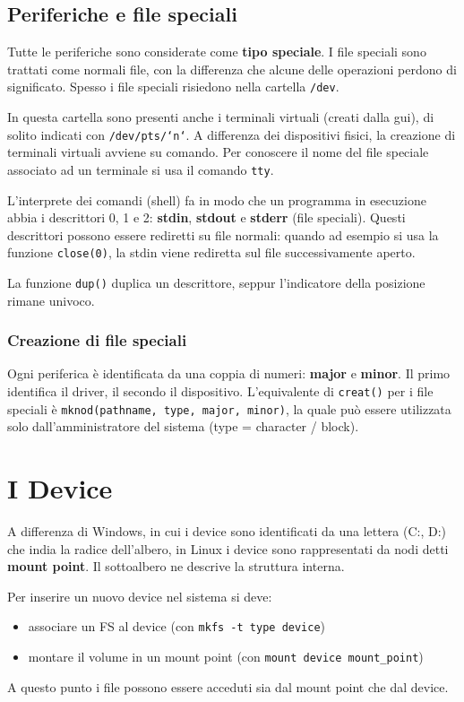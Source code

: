 \documentclass[12pt, a4paper]{report}
\begin{document}
\subsection{Periferiche e file speciali}
Tutte le periferiche sono considerate come \textbf{tipo speciale}. I file
speciali sono trattati come normali file, con la differenza che alcune delle
operazioni perdono di significato. Spesso i file speciali risiedono nella
cartella \texttt{/dev}.

In questa cartella sono presenti anche i terminali virtuali (creati dalla gui),
di solito indicati con \texttt{/dev/pts/`n`}. A differenza dei dispositivi fisici,
la creazione di terminali virtuali avviene su comando. Per conoscere il nome del
file speciale associato ad un terminale si usa il comando \texttt{tty}.

L'interprete dei comandi (shell) fa in modo che un programma in esecuzione abbia
i descrittori 0, 1 e 2: \textbf{stdin}, \textbf{stdout} e \textbf{stderr} (file
speciali). Questi descrittori possono essere rediretti su file normali: quando
ad esempio si usa la funzione \texttt{close(0)}, la stdin viene rediretta sul
file successivamente aperto.

La funzione \texttt{dup()} duplica un descrittore, seppur l'indicatore della
posizione rimane univoco.

\subsubsection{Creazione di file speciali}
Ogni periferica è identificata da una coppia di numeri: \textbf{major} e
\textbf{minor}. Il primo identifica il driver, il secondo il dispositivo.
L'equivalente di \texttt{creat()} per i file speciali è \texttt{mknod(pathname,
type, major, minor)}, la quale può essere utilizzata solo dall'amministratore
del sistema (type = character / block).

\section{I Device}
A differenza di Windows, in cui i device sono identificati da una lettera (C:,
D:) che india la radice dell'albero, in Linux i device sono rappresentati da
nodi detti \textbf{mount point}. Il sottoalbero ne descrive la struttura
interna.

Per inserire un nuovo device nel sistema si deve:
\begin{itemize}
	\item associare un FS al device (con \texttt{mkfs -t type device})
	\item montare il volume in un mount point (con \texttt{mount device
		mount\_point})
\end{itemize}
A questo punto i file possono essere acceduti sia dal mount point che dal
device.
\end{document}
